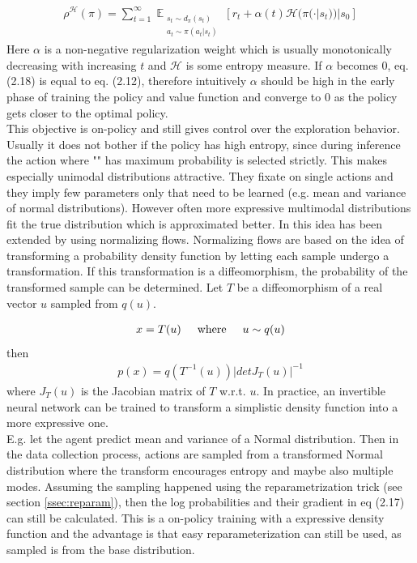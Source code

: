 \begin{align}
\rho^{\mathcal{H}}(\pi) = \sum_{t=1}^{\infty}\mathop{\mathbb{E}}_{\substack{s_t \sim d_\pi(s_t) \\ a_t \sim \pi(a_t|s_t)}} \left[ r_t + \alpha(t) \mathcal{H}(\pi(\cdot | s_t))|s_0 \right]
\end{align}
Here $\alpha$ is a non-negative regularization weight which is usually monotonically decreasing with increasing $t$ and $\mathcal{H}$ is some entropy measure. If $\alpha$ becomes $0$, eq. (2.18) is equal to eq. (2.12), therefore intuitively $\alpha$ should be high in the early phase of training the policy and value function and converge to $0$ as the policy gets closer to the optimal policy.\\
This objective is on-policy and still gives control over the exploration behavior. Usually it does not bother if the policy has high entropy, since during inference the action where "\pi" has maximum probability is selected strictly. This makes especially unimodal distributions attractive. They fixate on single actions and they imply few parameters only that need to be learned (e.g. mean and variance of normal distributions). However often more expressive multimodal distributions fit the true distribution which is approximated better. 
In \cite{DBLP:journals/corr/abs-1906-02771} this idea has been extended by using  normalizing flows. Normalizing flows \cite{papamakarios2019normalizing} are based on the idea of transforming a probability density function by letting each sample undergo a transformation. If this transformation is a diffeomorphism, the probability of the transformed sample can be determined. Let $T$ be a diffeomorphism of a real vector $u$ sampled from $q(u)$.

\begin{align}
	x=T(u) \text{\hspace{5mm}where\hspace{5mm}} u\sim q(u)
\end{align}
then
\begin{align}
p(x)=q(T^{-1}(u)) |detJ_T(u)|^{-1}
\end{align}
where $J_T(u)$ is the Jacobian matrix of $T$ w.r.t. $u$. In practice, an invertible neural network can be trained to transform a simplistic density function into a more expressive one.\\
E.g. let the agent predict mean and variance of a Normal distribution. Then in the data collection process, actions are sampled from a transformed Normal distribution where the transform encourages entropy and maybe also multiple modes. Assuming the sampling happened using the reparametrization trick (see section \ref{ssec:reparam}), then the log probabilities and their gradient in eq (2.17) can still be calculated. This is a on-policy training with a expressive density function and the advantage is that easy reparameterization can still be used, as sampled is from the base distribution.

